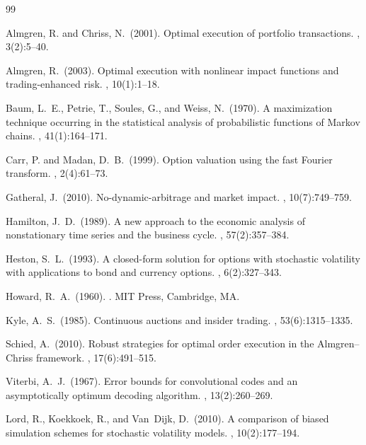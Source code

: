 \documentclass[11pt,letterpaper]{article}
\begin{document}

\begin{thebibliography}{99}

Almgren, R. and Chriss, N.\ (2001).
\newblock Optimal execution of portfolio transactions.
, 3(2):5--40.

Almgren, R.\ (2003).
\newblock Optimal execution with nonlinear impact functions and trading-enhanced risk.
, 10(1):1--18.

Baum, L.~E., Petrie, T., Soules, G., and Weiss, N.\ (1970).
\newblock A maximization technique occurring in the statistical analysis of probabilistic functions of Markov chains.
, 41(1):164--171.

Carr, P. and Madan, D.~B.\ (1999).
\newblock Option valuation using the fast Fourier transform.
, 2(4):61--73.

Gatheral, J.\ (2010).
\newblock No-dynamic-arbitrage and market impact.
, 10(7):749--759.

Hamilton, J.~D.\ (1989).
\newblock A new approach to the economic analysis of nonstationary time series and the business cycle.
, 57(2):357--384.

Heston, S.~L.\ (1993).
\newblock A closed-form solution for options with stochastic volatility with applications to bond and currency options.
, 6(2):327--343.

Howard, R.~A.\ (1960).
.
\newblock MIT Press, Cambridge, MA.

Kyle, A.~S.\ (1985).
\newblock Continuous auctions and insider trading.
, 53(6):1315--1335.

Schied, A.\ (2010).
\newblock Robust strategies for optimal order execution in the Almgren--Chriss framework.
, 17(6):491--515.

Viterbi, A.~J.\ (1967).
\newblock Error bounds for convolutional codes and an asymptotically optimum decoding algorithm.
, 13(2):260--269.

Lord, R., Koekkoek, R., and Van~Dijk, D.\ (2010).
\newblock A comparison of biased simulation schemes for stochastic volatility models.
, 10(2):177--194.

\end{thebibliography}
\end{document}
